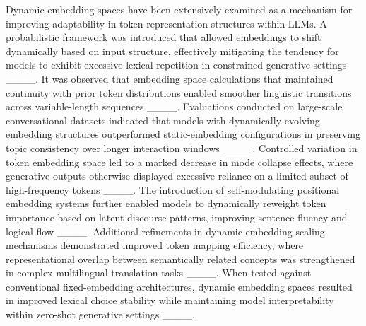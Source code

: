 Dynamic embedding spaces have been extensively examined as a mechanism for improving adaptability in token representation structures within LLMs. A probabilistic framework was introduced that allowed embeddings to shift dynamically based on input structure, effectively mitigating the tendency for models to exhibit excessive lexical repetition in constrained generative settings ____. It was observed that embedding space calculations that maintained continuity with prior token distributions enabled smoother linguistic transitions across variable-length sequences ____. Evaluations conducted on large-scale conversational datasets indicated that models with dynamically evolving embedding structures outperformed static-embedding configurations in preserving topic consistency over longer interaction windows ____. Controlled variation in token embedding space led to a marked decrease in mode collapse effects, where generative outputs otherwise displayed excessive reliance on a limited subset of high-frequency tokens ____. The introduction of self-modulating positional embedding systems further enabled models to dynamically reweight token importance based on latent discourse patterns, improving sentence fluency and logical flow ____. Additional refinements in dynamic embedding scaling mechanisms demonstrated improved token mapping efficiency, where representational overlap between semantically related concepts was strengthened in complex multilingual translation tasks ____. When tested against conventional fixed-embedding architectures, dynamic embedding spaces resulted in improved lexical choice stability while maintaining model interpretability within zero-shot generative settings ____.